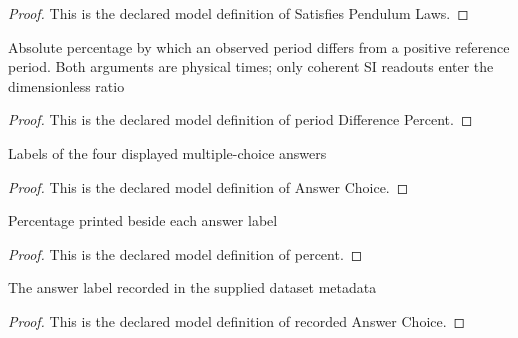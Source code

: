 \begin{proof}
  This is the declared model definition of Satisfies Pendulum Laws.
\end{proof}
\begin{definition}
  \label{def:physics:phyx-mini-0227:phyxminiproblems-problemphyxmini0227-perioddifferencepercent}
  Absolute percentage by which an observed period differs from a positive reference period. Both arguments are physical times; only coherent SI readouts enter the dimensionless ratio
\end{definition}
\begin{proof}
  This is the declared model definition of period Difference Percent.
\end{proof}
\begin{definition}
  \label{def:physics:phyx-mini-0227:phyxminiproblems-problemphyxmini0227-answerchoice}
  Labels of the four displayed multiple-choice answers
\end{definition}
\begin{proof}
  This is the declared model definition of Answer Choice.
\end{proof}
\begin{definition}[percent]
  \label{def:physics:phyx-mini-0227:phyxminiproblems-problemphyxmini0227-answerchoice-percent}
  Percentage printed beside each answer label
\end{definition}
\begin{proof}
  This is the declared model definition of percent.
\end{proof}
\begin{definition}
  \label{def:physics:phyx-mini-0227:phyxminiproblems-problemphyxmini0227-recordedanswerchoice}
  The answer label recorded in the supplied dataset metadata
\end{definition}
\begin{proof}
  This is the declared model definition of recorded Answer Choice.
\end{proof}
